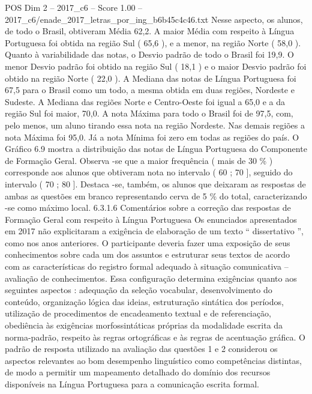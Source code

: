 \begin{textsample}{POS Dim 2 – 2017\_c6 – Score 1.00 – 2017\_c6/enade\_2017\_letras\_por\_ing\_b6b45c4c46.txt}
Nesse aspecto, os alunos, de todo o Brasil, obtiveram Média 62,2.
A maior Média com respeito à Língua Portuguesa foi obtida na região Sul ( 65,6 ), e a menor, na região Norte ( 58,0 ).
Quanto à variabilidade das notas, o Desvio padrão de todo o Brasil foi 19,9.
O menor Desvio padrão foi obtido na região Sul ( 18,1 ) e o maior Desvio padrão foi obtido na região Norte ( 22,0 ).
A Mediana das notas de Língua Portuguesa foi 67,5 para o Brasil como um todo, a mesma obtida em duas regiões, Nordeste e Sudeste.
A Mediana das regiões Norte e Centro-Oeste foi igual a 65,0 e a da região Sul foi maior, 70,0.
A nota Máxima para todo o Brasil foi de 97,5, com, pelo menos, um aluno tirando essa nota na região Nordeste.
Nas demais regiões a nota Máxima foi 95,0.
Já a nota Mínima foi zero em todas as regiões do país.
O Gráfico 6.9 mostra a distribuição das notas de Língua Portuguesa do Componente de Formação Geral.
Observa -se que a maior frequência ( mais de 30 \% ) corresponde aos alunos que obtiveram nota no intervalo ( 60 ; 70 ], seguido do intervalo ( 70 ; 80 ].
Destaca -se, também, os alunos que deixaram as respostas de ambas as questões em branco representando cerva de 5 \% do total, caracterizando -se como máximo local. 6.3.1.6 Comentários sobre a correção das respostas de Formação Geral com respeito à Língua Portuguesa Os enunciados apresentados em 2017 não explicitaram a exigência de elaboração de um texto “ dissertativo ”, como nos anos anteriores.
O participante deveria fazer uma exposição de seus conhecimentos sobre cada um dos assuntos e estruturar seus textos de acordo com as características do registro formal adequado à situação comunicativa – avaliação de conhecimentos.
Essa configuração determina exigências quanto aos seguintes aspectos : adequação da seleção vocabular, desenvolvimento do conteúdo, organização lógica das ideias, estruturação sintática dos períodos, utilização de procedimentos de encadeamento textual e de referenciação, obediência às exigências morfossintáticas próprias da modalidade escrita da norma-padrão, respeito às regras ortográficas e às regras de acentuação gráfica.
O padrão de resposta utilizado na avaliação das questões 1 e 2 considerou os aspectos relevantes ao bom desempenho linguístico como competências distintas, de modo a permitir um mapeamento detalhado do domínio dos recursos disponíveis na Língua Portuguesa para a comunicação escrita formal.

\end{textsample}
